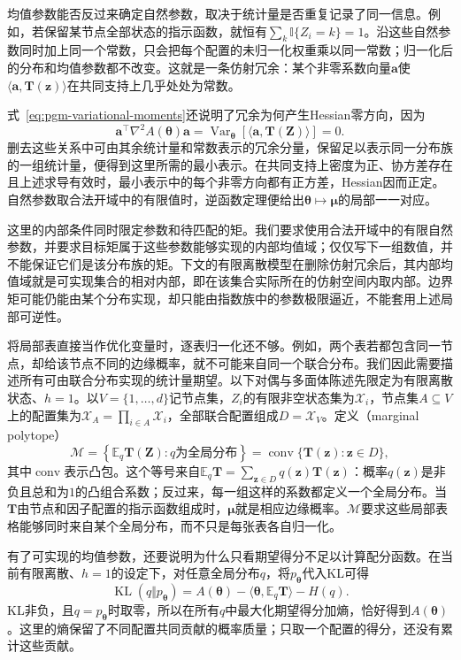 均值参数能否反过来确定自然参数，取决于统计量是否重复记录了同一信息。例如，若保留某节点全部状态的指示函数，就恒有$\sum_k\mathbb I\{Z_i=k\}=1$。沿这些自然参数同时加上同一个常数，只会把每个配置的未归一化权重乘以同一常数；归一化后的分布和均值参数都不改变。这就是一条仿射冗余：某个非零系数向量$\bm a$使$\langle\bm a,\bm T(\bm z)\rangle$在共同支持上几乎处处为常数。

式~\eqref{eq:pgm-variational-moments}还说明了冗余为何产生Hessian零方向，因为
\[
  \bm a^\top\nabla^2A(\bm\theta)\bm a
    =\operatorname{Var}_{\bm\theta}
          [\langle\bm a,\bm T(\bm Z)\rangle]=0.
\]
删去这些关系中可由其余统计量和常数表示的冗余分量，保留足以表示同一分布族的一组统计量，便得到这里所需的最小表示。在共同支持上密度为正、协方差存在且上述求导有效时，最小表示中的每个非零方向都有正方差，Hessian因而正定。自然参数取合法开域中的有限值时，逆函数定理便给出$\bm\theta\mapsto\bm\mu$的局部一一对应。

这里的内部条件同时限定参数和待匹配的矩。我们要求使用合法开域中的有限自然参数，并要求目标矩属于这些参数能够实现的内部均值域；仅仅写下一组数值，并不能保证它们是该分布族的矩。下文的有限离散模型在删除仿射冗余后，其内部均值域就是可实现集合的相对内部，即在该集合实际所在的仿射空间内取内部。边界矩可能仍能由某个分布实现，却只能由指数族中的参数极限逼近，不能套用上述局部可逆性。

将局部表直接当作优化变量时，逐表归一化还不够。例如，两个表若都包含同一节点，却给该节点不同的边缘概率，就不可能来自同一个联合分布。我们因此需要描述所有可由联合分布实现的统计量期望。以下对偶与多面体陈述先限定为有限离散状态、$h=1$。以$V=\{1,\ldots,d\}$记节点集，$Z_i$的有限非空状态集为$\mathcal X_i$，节点集$A\subseteq V$上的配置集为$\mathcal X_A=\prod_{i\in A}\mathcal X_i$，全部联合配置组成$D=\mathcal X_V$。定义（marginal polytope）
\begin{equation}
  \mathcal M
    =\left\{\mathbb E_q\bm{T}(\bm{Z}):q\text{为全局分布}\right\}
    =\operatorname{conv}\{\bm{T}(\bm{z}):\bm{z}\in D\},
  \label{eq:pgm-variational-marginal-polytope}
\end{equation}
其中$\operatorname{conv}$表示凸包。这个等号来自$\mathbb E_q\bm T=\sum_{\bm z\in D}q(\bm z)\bm T(\bm z)$：概率$q(\bm z)$是非负且总和为$1$的凸组合系数；反过来，每一组这样的系数都定义一个全局分布。当$\bm{T}$由节点和因子配置的指示函数组成时，$\bm{\mu}$就是相应边缘概率。$\mathcal M$要求这些局部表格能够同时来自某个全局分布，而不只是每张表各自归一化。

有了可实现的均值参数，还要说明为什么只看期望得分不足以计算配分函数。在当前有限离散、$h=1$的设定下，对任意全局分布$q$，将$p_{\bm\theta}$代入KL可得
\[
  \operatorname{KL}(q\Vert p_{\bm\theta})
    =A(\bm\theta)-\langle\bm\theta,\mathbb E_q\bm T\rangle-H(q).
\]
KL非负，且$q=p_{\bm\theta}$时取零，所以在所有$q$中最大化期望得分加熵，恰好得到$A(\bm\theta)$。这里的熵保留了不同配置共同贡献的概率质量；只取一个配置的得分，还没有累计这些贡献。

